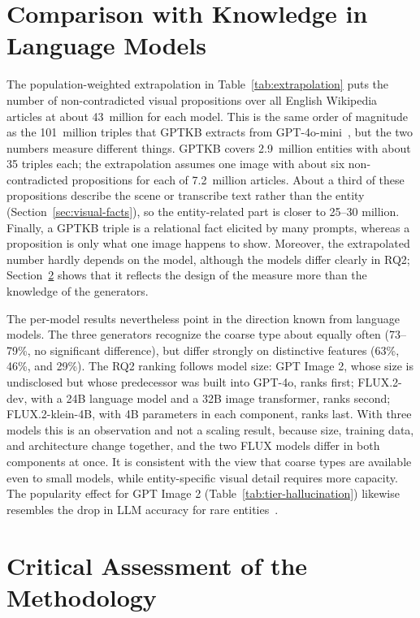 \section{Comparison with Knowledge in Language Models}
\label{sec:discussion-llm}

The population-weighted extrapolation in Table~\ref{tab:extrapolation} puts
the number of non-contradicted visual propositions over all English Wikipedia articles
at about 43~million for each model. This is the same order of magnitude as the
101~million triples that GPTKB extracts from GPT-4o-mini~\citep{gptkb2025}, but
the two numbers measure different things. GPTKB covers 2.9~million entities with
about 35 triples each; the extrapolation assumes one image with about six
non-contradicted propositions for each of 7.2~million articles. About a third of these
propositions describe the scene or transcribe text rather than the entity
(Section~\ref{sec:visual-facts}), so the entity-related part is closer to 25--30
million. Finally, a GPTKB triple is a relational fact elicited by many prompts,
whereas a proposition is only what one image happens to show. Moreover, the
extrapolated number hardly depends on the model, although the models differ
clearly in RQ2; Section~\ref{sec:methodology-critique} shows that it reflects
the design of the measure more than the knowledge of the generators.

The per-model results nevertheless point in the direction known from language
models. The three generators recognize the coarse type about equally often
(73--79\%, no significant difference), but differ strongly on distinctive
features (63\%, 46\%, and 29\%). The RQ2 ranking follows model size: GPT Image 2, whose size is undisclosed but
whose predecessor was built into GPT-4o, ranks first; FLUX.2-dev, with a 24B
language model and a 32B image transformer, ranks second; FLUX.2-klein-4B, with
4B parameters in each component, ranks last. With three models this is an
observation and not a scaling result, because size, training data, and
architecture change together, and the two FLUX models differ in both
components at once. It is consistent with the view that coarse types are
available even to small models, while entity-specific visual detail requires
more capacity. The popularity effect for GPT Image 2
(Table~\ref{tab:tier-hallucination}) likewise resembles the drop in LLM accuracy
for rare entities~\citep{mallen2023,kandpal2023}.

\section{Critical Assessment of the Methodology}
\label{sec:methodology-critique}

